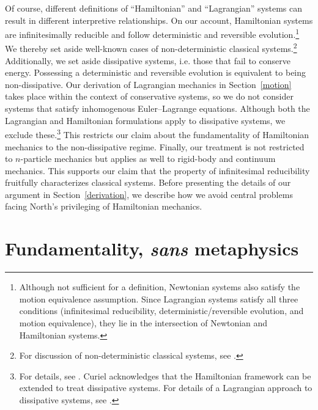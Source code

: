 \documentclass[12pt, twoside]{article}
\begin{document}
Of course, different definitions of ``Hamiltonian'' and ``Lagrangian'' systems can result in different interpretive relationships. On our account, Hamiltonian systems are infinitesimally reducible and follow deterministic and reversible evolution.\footnote{Although not sufficient for a definition, Newtonian systems also satisfy the motion equivalence assumption. Since Lagrangian systems satisfy all three conditions (infinitesimal reducibility, deterministic/reversible evolution, and motion equivalence), they lie in the intersection of Newtonian and Hamiltonian systems.} We thereby set aside well-known cases of non-deterministic classical systems.\footnote{For discussion of non-deterministic classical systems, see \textcites*[3-4]{Baez}{Earman}{Norton}.} Additionally, we set aside dissipative systems, i.e. those that fail to conserve energy. Possessing a deterministic and reversible evolution is equivalent to being non-dissipative. Our derivation of Lagrangian mechanics in Section~\ref{motion} takes place within the context of conservative systems, so we do not consider systems that satisfy inhomogenous Euler--Lagrange equations. Although both the Lagrangian and Hamiltonian formulations apply to dissipative systems, we exclude these.\footnote{For details, see \textcites[\S 10.4]{Cline}. Curiel \parencites*[311]{Curiel} acknowledges that the Hamiltonian framework can be extended to treat dissipative systems. For details of a Lagrangian approach to dissipative systems, see \textcites[]{Smith}.} This restricts our claim about the fundamentality of Hamiltonian mechanics to the non-dissipative regime. Finally, our treatment is not restricted to $n$-particle mechanics but applies as well to rigid-body and continuum mechanics. This supports our claim that the property of infinitesimal reducibility fruitfully characterizes classical systems. Before presenting the details of our argument in Section~\ref{derivation}, we describe how we avoid central problems facing North's privileging of Hamiltonian mechanics. 


\section{Fundamentality, \textit{sans} metaphysics}
\label{fundamentality}
\end{document}
